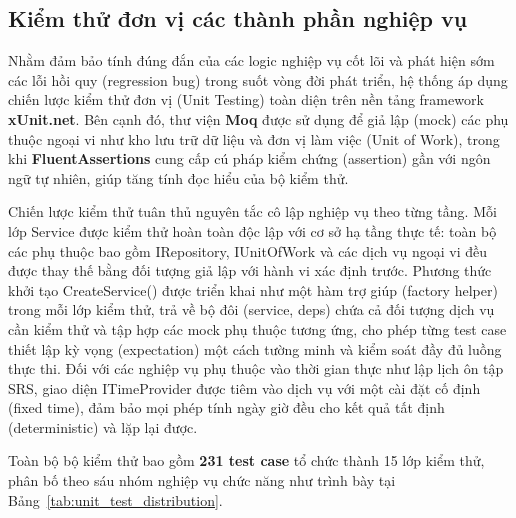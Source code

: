 \subsection{Kiểm thử đơn vị các thành phần nghiệp vụ}

Nhằm đảm bảo tính đúng đắn của các logic nghiệp vụ cốt lõi và phát hiện sớm các lỗi hồi quy (regression bug) trong suốt vòng đời phát triển, hệ thống áp dụng chiến lược kiểm thử đơn vị (Unit Testing) toàn diện trên nền tảng framework \textbf{xUnit.net}. Bên cạnh đó, thư viện \textbf{Moq} được sử dụng để giả lập (mock) các phụ thuộc ngoại vi như kho lưu trữ dữ liệu và đơn vị làm việc (Unit of Work), trong khi \textbf{FluentAssertions} cung cấp cú pháp kiểm chứng (assertion) gần với ngôn ngữ tự nhiên, giúp tăng tính đọc hiểu của bộ kiểm thử.

Chiến lược kiểm thử tuân thủ nguyên tắc cô lập nghiệp vụ theo từng tầng. Mỗi lớp Service được kiểm thử hoàn toàn độc lập với cơ sở hạ tầng thực tế: toàn bộ các phụ thuộc bao gồm IRepository, IUnitOfWork và các dịch vụ ngoại vi đều được thay thế bằng đối tượng giả lập với hành vi xác định trước. Phương thức khởi tạo CreateService() được triển khai như một hàm trợ giúp (factory helper) trong mỗi lớp kiểm thử, trả về bộ đôi (service, deps) chứa cả đối tượng dịch vụ cần kiểm thử và tập hợp các mock phụ thuộc tương ứng, cho phép từng test case thiết lập kỳ vọng (expectation) một cách tường minh và kiểm soát đầy đủ luồng thực thi. Đối với các nghiệp vụ phụ thuộc vào thời gian thực như lập lịch ôn tập SRS, giao diện ITimeProvider được tiêm vào dịch vụ với một cài đặt cố định (fixed time), đảm bảo mọi phép tính ngày giờ đều cho kết quả tất định (deterministic) và lặp lại được.

Toàn bộ bộ kiểm thử bao gồm \textbf{231 test case} tổ chức thành 15 lớp kiểm thử, phân bố theo sáu nhóm nghiệp vụ chức năng như trình bày tại Bảng~\ref{tab:unit_test_distribution}.

